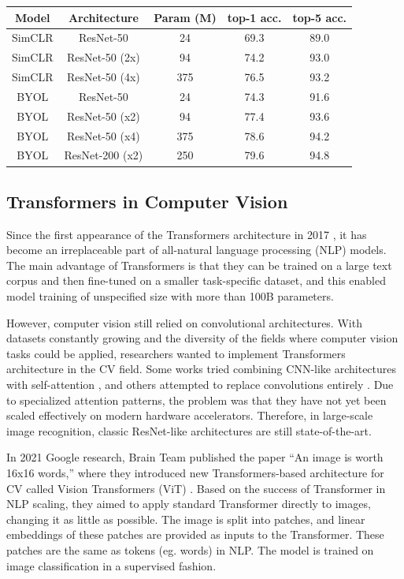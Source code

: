 \documentclass[
]{krantz}
\begin{document}
\begin{longtable}[]{@{}ccccc@{}}
\toprule
Model & Architecture & Param (M) & top-1 acc. & top-5 acc.\tabularnewline
\midrule
\endhead
SimCLR & ResNet-50 & 24 & 69.3 & 89.0\tabularnewline
SimCLR & ResNet-50 (2x) & 94 & 74.2 & 93.0\tabularnewline
SimCLR & ResNet-50 (4x) & 375 & 76.5 & 93.2\tabularnewline
BYOL & ResNet-50 & 24 & 74.3 & 91.6\tabularnewline
BYOL & ResNet-50 (x2) & 94 & 77.4 & 93.6\tabularnewline
BYOL & ResNet-50 (x4) & 375 & 78.6 & 94.2\tabularnewline
BYOL & ResNet-200 (x2) & 250 & 79.6 & 94.8\tabularnewline
\bottomrule
\end{longtable}

\hypertarget{transformers-in-computer-vision}{%
\subsection{Transformers in Computer Vision}\label{transformers-in-computer-vision}}

Since the first appearance of the Transformers architecture in 2017 \citet{TRANSFORMERS_NLP}, it has become an irreplaceable part of all-natural language processing (NLP) models. The main advantage of Transformers is that they can be trained on a large text corpus and then fine-tuned on a smaller task-specific dataset, and this enabled model training of unspecified size with more than 100B parameters.

However, computer vision still relied on convolutional architectures. With datasets constantly growing and the diversity of the fields where computer vision tasks could be applied, researchers wanted to implement Transformers architecture in the CV field. Some works tried combining CNN-like architectures with self-attention \citet{wang}, and others attempted to replace convolutions entirely \citet{selfa}. Due to specialized attention patterns, the problem was that they have not yet been scaled effectively on modern hardware accelerators. Therefore, in large-scale image recognition, classic ResNet-like architectures are still state-of-the-art.

In 2021 Google research, Brain Team published the paper ``An image is worth 16x16 words,'' where they introduced new Transformers-based architecture for CV called Vision Transformers (ViT) \citet{vit}. Based on the success of Transformer in NLP scaling, they aimed to apply standard Transformer directly to images, changing it as little as possible. The image is split into patches, and linear embeddings of these patches are provided as inputs to the Transformer.
These patches are the same as tokens (eg. words) in NLP. The model is trained on image classification in a supervised fashion.
\end{document}

